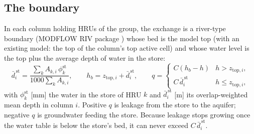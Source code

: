 \subsection{The boundary}
In each column holding HRUs of the group, the exchange is a river-type boundary (MODFLOW RIV package ) whose bed is the
model top (with an existing model: the top of the column's top active cell) and whose water level is the top plus the average depth of water in the store:
\begin{equation}
\bar d^{\,\mathrm{st}}_i=\frac{\sum_kA_{k,i}\,\phi^{\mathrm{st}}_k}{1000\sum_kA_{k,i}},\qquad h_b=z_{\mathrm{top},i}+\bar d^{\,\mathrm{st}}_i,
\qquad q=\begin{cases}C\left(h_b-h\right) & h>z_{\mathrm{top},i},\\ C\,\bar d^{\,\mathrm{st}}_i & h\le z_{\mathrm{top},i},\end{cases}
\end{equation}
with $\phi^{\mathrm{st}}_k$ [mm] the water in the store of HRU $k$ and $\bar d^{\,\mathrm{st}}_i$ [m] its overlap-weighted mean depth in column $i$. Positive $q$ is leakage from the store to
the aquifer; negative $q$ is groundwater feeding the store. Because leakage stops growing once the water table is below
the store's bed, it can never exceed $C\,\bar d^{\,\mathrm{st}}_i$.


